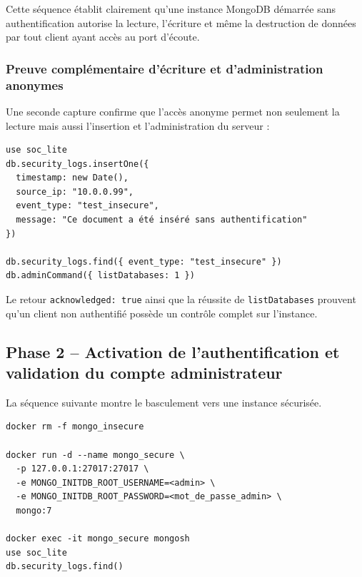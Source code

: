 \documentclass[11pt,a4paper]{article}
\begin{document}
\begin{resultbox}
Cette séquence établit clairement qu'une instance MongoDB démarrée sans authentification autorise la lecture, l'écriture et même la destruction de données par tout client ayant accès au port d'écoute.
\end{resultbox}

\subsubsection*{Preuve complémentaire d'écriture et d'administration anonymes}

Une seconde capture confirme que l'accès anonyme permet non seulement la lecture mais aussi l'insertion et l'administration du serveur :

\begin{tcolorbox}[breakable,colback=CodeBg,colframe=CodeFrame,title=Commandes observées]
\begin{Verbatim}[fontsize=\small,breaklines,breakanywhere]
use soc_lite
db.security_logs.insertOne({
  timestamp: new Date(),
  source_ip: "10.0.0.99",
  event_type: "test_insecure",
  message: "Ce document a été inséré sans authentification"
})

db.security_logs.find({ event_type: "test_insecure" })
db.adminCommand({ listDatabases: 1 })
\end{Verbatim}
\end{tcolorbox}

Le retour \texttt{acknowledged: true} ainsi que la réussite de \texttt{listDatabases} prouvent qu'un client non authentifié possède un contrôle complet sur l'instance.

\subsection{Phase 2 -- Activation de l'authentification et validation du compte administrateur}

La séquence suivante montre le basculement vers une instance sécurisée.

\begin{tcolorbox}[breakable,colback=CodeBg,colframe=CodeFrame,title=Commandes observées (version sécurisée)]
\begin{Verbatim}[fontsize=\small,breaklines,breakanywhere]
docker rm -f mongo_insecure

docker run -d --name mongo_secure \
  -p 127.0.0.1:27017:27017 \
  -e MONGO_INITDB_ROOT_USERNAME=<admin> \
  -e MONGO_INITDB_ROOT_PASSWORD=<mot_de_passe_admin> \
  mongo:7

docker exec -it mongo_secure mongosh
use soc_lite
db.security_logs.find()
\end{Verbatim}
\end{tcolorbox}
\end{document}
